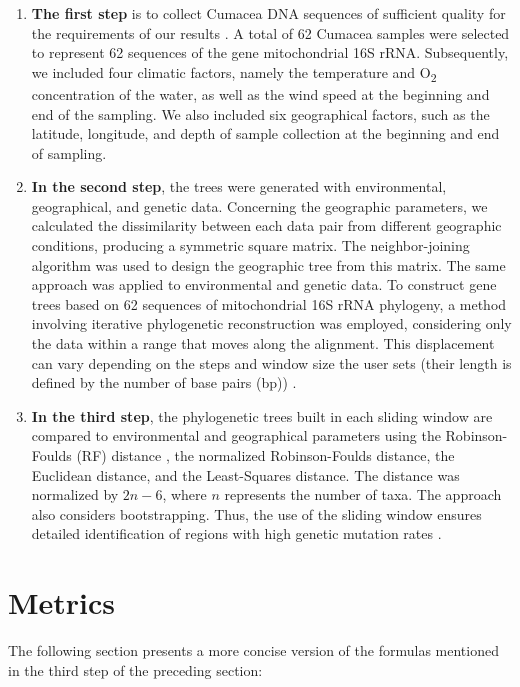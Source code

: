 \begin{enumerate}
\item \textbf{The first step} is to collect Cumacea DNA sequences of sufficient quality for the requirements of our results \citep{koshkarov_phylogeography_2022}. A total of 62 Cumacea samples were selected to represent 62 sequences of the gene mitochondrial 16S rRNA. Subsequently, we included four climatic factors, namely the temperature and O\textsubscript{2} concentration of the water, as well as the wind speed at the beginning and end of the sampling. We also included six geographical factors, such as the latitude, longitude, and depth of sample collection at the beginning and end of sampling.

\item \textbf{In the second step}, the trees were generated with environmental, geographical, and genetic data. Concerning the geographic parameters, we calculated the dissimilarity between each data pair from different geographic conditions, producing a symmetric square matrix. The neighbor-joining algorithm was used to design the geographic tree from this matrix. The same approach was applied to environmental and genetic data. To construct gene trees based on 62 sequences of mitochondrial 16S rRNA phylogeny, a method involving iterative phylogenetic reconstruction was employed, considering only the data within a range that moves along the alignment. This displacement can vary depending on the steps and window size the user sets (their length is defined by the number of base pairs (bp)) \citep{koshkarov_phylogeography_2022}.

\item \textbf{In the third step}, the phylogenetic trees built in each sliding window are compared to environmental and geographical parameters using the Robinson-Foulds (RF) distance \citep{robinson_comparison_1981, koshkarov_phylogeography_2022}, the normalized Robinson-Foulds distance, the Euclidean distance, and the Least-Squares distance. The distance was normalized by $2n-6$, where $n$ represents the number of taxa. The approach also considers bootstrapping. Thus, the use of the sliding window ensures detailed identification of regions with high genetic mutation rates \citep{koshkarov_phylogeography_2022}.
\end{enumerate}

\section{Metrics}\label{metrics}
The following section presents a more concise version of the formulas mentioned in the third step of the preceding section:

